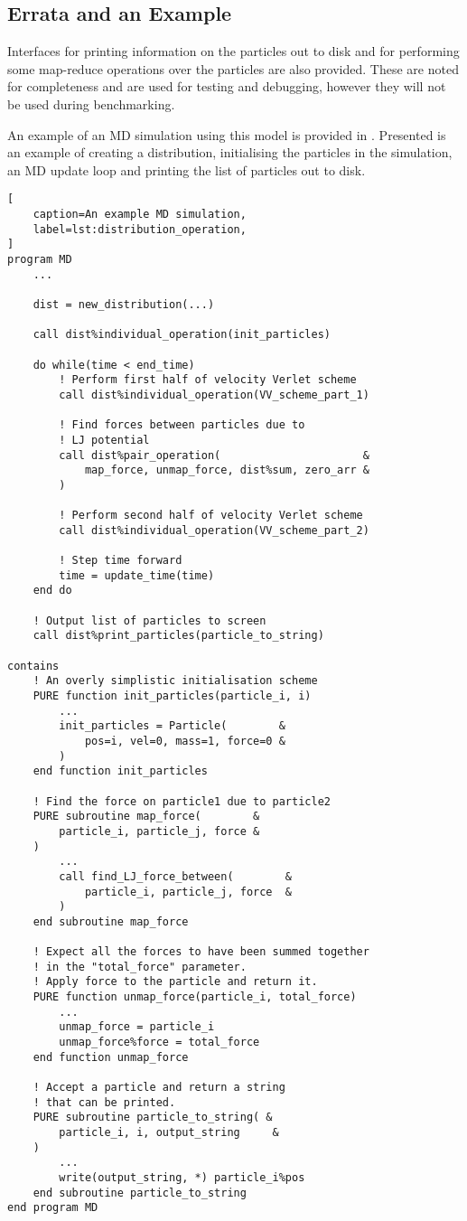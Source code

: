 \subsection{Errata and an Example}

Interfaces for printing information on the particles
out to disk and for performing some map-reduce operations over
the particles are also provided.
%
These are noted for completeness and are used for testing and debugging,
however they will not be used during benchmarking.

An example of an MD simulation using this model is provided in
.
%
Presented is an example of creating a distribution,
initialising the particles in the simulation,
an MD update loop and
printing the list of particles out to disk.


\begin{lstlisting}[
    caption=An example MD simulation,
    label=lst:distribution_operation,
]
program MD
    ...

    dist = new_distribution(...)

    call dist%individual_operation(init_particles)

    do while(time < end_time)
        ! Perform first half of velocity Verlet scheme
        call dist%individual_operation(VV_scheme_part_1)

        ! Find forces between particles due to
        ! LJ potential
        call dist%pair_operation(                      &
            map_force, unmap_force, dist%sum, zero_arr &
        )

        ! Perform second half of velocity Verlet scheme
        call dist%individual_operation(VV_scheme_part_2)

        ! Step time forward
        time = update_time(time)
    end do

    ! Output list of particles to screen
    call dist%print_particles(particle_to_string)

contains
    ! An overly simplistic initialisation scheme
    PURE function init_particles(particle_i, i)
        ...
        init_particles = Particle(        &
            pos=i, vel=0, mass=1, force=0 &
        )
    end function init_particles

    ! Find the force on particle1 due to particle2
    PURE subroutine map_force(        &
        particle_i, particle_j, force &
    )
        ...
        call find_LJ_force_between(        &
            particle_i, particle_j, force  &
        )
    end subroutine map_force

    ! Expect all the forces to have been summed together
    ! in the "total_force" parameter.
    ! Apply force to the particle and return it.
    PURE function unmap_force(particle_i, total_force)
        ...
        unmap_force = particle_i
        unmap_force%force = total_force
    end function unmap_force

    ! Accept a particle and return a string
    ! that can be printed.
    PURE subroutine particle_to_string( &
        particle_i, i, output_string     &
    )
        ...
        write(output_string, *) particle_i%pos
    end subroutine particle_to_string
end program MD
\end{lstlisting}

